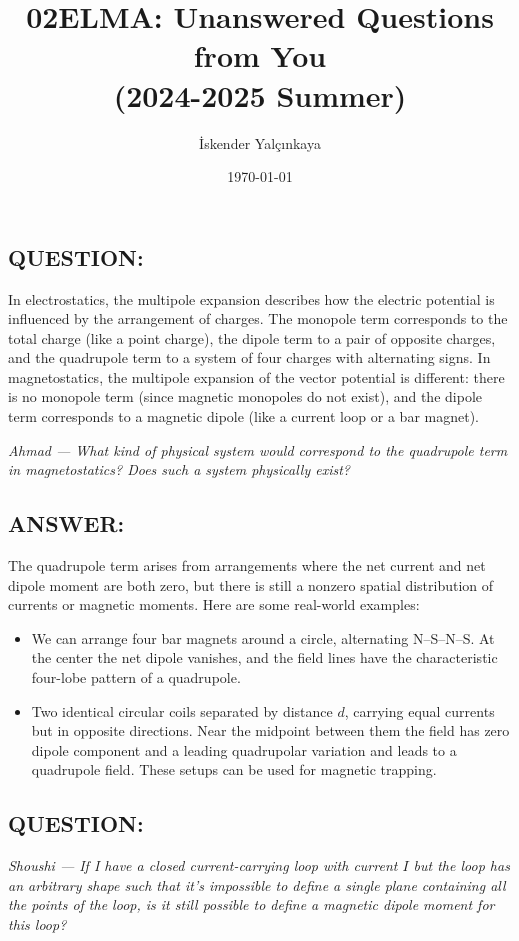 \documentclass[12pt]{article}
\title{02ELMA: Unanswered Questions from You \\ 
(2024-2025 Summer)}
\author{İskender Yalçınkaya}
\date{\today}
\begin{document}
\maketitle

\subsection*{QUESTION:}
In electrostatics, the multipole expansion describes how the electric potential is influenced by the arrangement of charges. The monopole term corresponds to the total charge (like a point charge), the dipole term to a pair of opposite charges, and the quadrupole term to a system of four charges with alternating signs. In magnetostatics, the multipole expansion of the vector potential is different: there is no monopole term (since magnetic monopoles do not exist), and the dipole term corresponds to a magnetic dipole (like a current loop or a bar magnet).

\noindent
\emph{Ahmad --- What kind of physical system would correspond to the quadrupole term in magnetostatics? Does such a system physically exist?}

\subsection*{ANSWER:}
The quadrupole term arises from arrangements where the net current and net dipole moment are both zero, but there is still a nonzero spatial distribution of currents or magnetic moments. Here are some real-world examples:

\begin{itemize}
    \item We can arrange four bar magnets around a circle, alternating N–S–N–S. At the center the net dipole vanishes, and the field lines have the characteristic four-lobe pattern of a quadrupole.
    \item Two identical circular coils separated by distance $d$, carrying equal currents but in opposite directions. Near the midpoint between them the field has zero dipole component and a leading quadrupolar variation and leads to a quadrupole field. These setups can be used for magnetic trapping.
\end{itemize}

\newpage

\subsection*{QUESTION:}
\emph{Shoushi --- If I have a closed current-carrying loop with current $I$ but the loop has an arbitrary shape such that it’s impossible to define a single plane containing all the points of the loop, is it still possible to define a magnetic dipole moment for this loop?}
\end{document}
